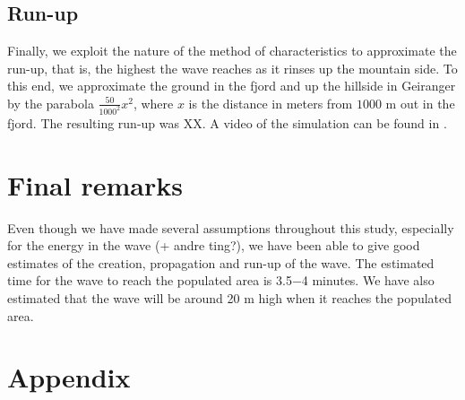 \documentclass[11pt]{article}
\begin{document}
\subsection{Run-up}
Finally, we exploit the nature of the method of characteristics to approximate the run-up, that is, the highest the wave reaches as it rinses up the mountain side. To this end, we
approximate the ground in the fjord and up the hillside in Geiranger by the parabola $\frac{50}{1000^2}x^2$, where $x$ is the distance in meters from $1000$ m out in the fjord.
The resulting run-up was XX. A video of the simulation can be found in \cite{}.    
%
%
\section{Final remarks}
Even though we have made several assumptions throughout this study, especially for the energy in the wave (+ andre ting?), we have been able to give good estimates of the creation,
propagation and run-up of the wave. The estimated time for the wave to reach  the populated area is 3.5$-$4 minutes. We have also estimated that the wave will be around 20 m high when it reaches the populated area. 

\clearpage
\section*{Appendix}
\end{document}
